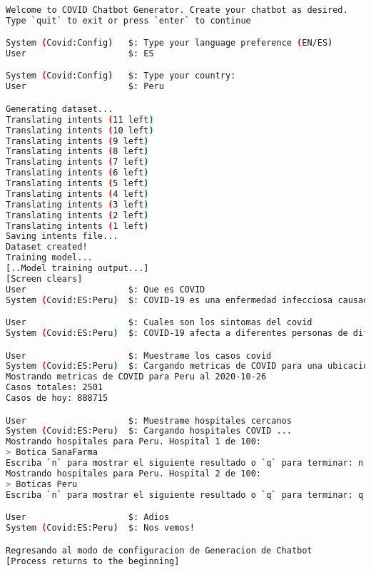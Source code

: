\documentclass[]{article}
\begin{document}
\begin{lstlisting}[language=bash, caption=Spanish Chatbot Test Case, style=mybashcode]

Welcome to COVID Chatbot Generator. Create your chatbot as desired.
Type `quit` to exit or press `enter` to continue

System (Covid:Config)   $: Type your language preference (EN/ES)
User                    $: ES

System (Covid:Config)   $: Type your country:
User                    $: Peru

Generating dataset...
Translating intents (11 left)
Translating intents (10 left)
Translating intents (9 left)
Translating intents (8 left)
Translating intents (7 left)
Translating intents (6 left)
Translating intents (5 left)
Translating intents (4 left)
Translating intents (3 left)
Translating intents (2 left)
Translating intents (1 left)
Saving intents file...
Dataset created!
Training model...
[..Model training output...]
[Screen clears]
User                    $: Que es COVID
System (Covid:ES:Peru)  $: COVID-19 es una enfermedad infecciosa causada por el coronavirus 2 sindrome respiratorio agudo severo

User                    $: Cuales son los sintomas del covid
System (Covid:ES:Peru)  $: COVID-19 afecta a diferentes personas de diferentes maneras. Se ha informado de una amplia gama de sintomas de personas infectadas, desde sintomas leves hasta enfermedades graves.

User                    $: Muestrame los casos covid
System (Covid:ES:Peru)  $: Cargando metricas de COVID para una ubicacion especifica ...
Mostrando metricas de COVID para Peru al 2020-10-26
Casos totales: 2501
Casos de hoy: 888715

User                    $: Muestrame hospitales cercanos
System (Covid:ES:Peru)  $: Cargando hospitales COVID ...
Mostrando hospitales para Peru. Hospital 1 de 100:
> Botica SanaFarma
Escriba `n` para mostrar el siguiente resultado o `q` para terminar: n
Mostrando hospitales para Peru. Hospital 2 de 100:
> Boticas Peru
Escriba `n` para mostrar el siguiente resultado o `q` para terminar: q

User                    $: Adios
System (Covid:ES:Peru)  $: Nos vemos!

Regresando al modo de configuracion de Generacion de Chatbot
[Process returns to the beginning]
\end{lstlisting}
\end{document}

